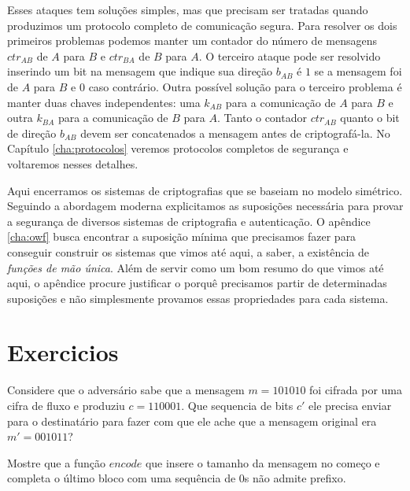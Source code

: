 Esses ataques tem soluções simples, mas que precisam ser tratadas quando produzimos um protocolo completo de comunicação segura.
Para resolver os dois primeiros problemas podemos manter um contador do número de mensagens $ctr_{AB}$ de $A$ para $B$ e $ctr_{BA}$ de $B$ para $A$.
O terceiro ataque pode ser resolvido inserindo um bit na mensagem que indique sua direção $b_{AB}$ é $1$ se a mensagem foi de $A$ para $B$ e $0$ caso contrário.
Outra possível solução para o terceiro problema é manter duas chaves independentes: uma $k_{AB}$ para a comunicação de $A$ para $B$ e outra $k_{BA}$ para a comunicação de $B$ para $A$.
Tanto o contador $ctr_{AB}$ quanto o bit de direção $b_{AB}$ devem ser concatenados a mensagem antes de criptografá-la.
No Capítulo \ref{cha:protocolos} veremos protocolos completos de segurança e voltaremos nesses detalhes.

Aqui encerramos os sistemas de criptografias que se baseiam no modelo simétrico. 
Seguindo a abordagem moderna explicitamos as suposições necessária para provar a segurança de diversos sistemas de criptografia e autenticação.
O apêndice \ref{cha:owf} busca encontrar a suposição mínima que precisamos fazer para conseguir construir os sistemas que vimos até aqui, a saber, a existência de {\em funções de mão única}.
Além de servir como um bom resumo do que vimos até aqui, o apêndice procure justificar o porquê precisamos partir de determinadas suposições e não simplesmente provamos essas propriedades para cada sistema.

\section{Exercicios}
\label{sec:exercicios}


\begin{exercicio}
  Considere que o adversário sabe que a mensagem $m = 101010$ foi cifrada por uma cifra de fluxo e produziu $c = 110001$.
  Que sequencia de bits $c'$ ele precisa enviar para o destinatário para fazer com que ele ache que a mensagem original era $m' = 001011$?
\end{exercicio}


\begin{exercicio}
  Mostre que a função $encode$ que insere o tamanho da mensagem no começo e completa o último bloco com uma sequência de $0$s não admite prefixo.
\end{exercicio}

